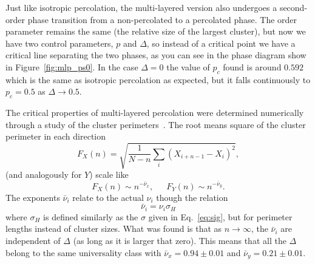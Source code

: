 Just like isotropic percolation, the multi-layered version also undergoes a
second-order phase transition from a non-percolated to a percolated phase. The
order parameter  remains the same (the relative size of the largest cluster),
but now we have two control parameters, $p$ and $\Delta$, so instead of a
critical point we have a critical line separating the two phases, as you can
see in the phase diagram show in Figure~\ref{fig:mlp_ps0}. In the case
$\Delta=0$ the value of $p_c$ found is around $0.592$ which is the same as
isotropic percolation as expected, but it falls continuously to $p_c=0.5$ as
$\Delta\rightarrow 0.5$.

The critical properties of multi-layered percolation were determined
numerically through a study of the cluster perimeters~\cite{Dayan1991,
Samyr2009}. The root means square of the cluster perimeter in each direction
\begin{equation}
    F_{X}\left(n\right)=
    \sqrt{\frac{1}{N-n}\sum_{i}{\left(X_{i+n-1}-X_{i}\right)}^{2}},
\end{equation}
(and analogously for $Y$) scale like
\begin{equation}
    F_{X}\left(n\right)\sim n^{-\bar{\nu}_{x}},
    \,\,\,\,\,\,\,\,\,
    F_{Y}\left(n\right)\sim n^{-\bar{\nu}_{y}}.
\end{equation}
The exponents $\bar{\nu}_i$ relate to the actual $\nu_i$ though the relation
\begin{equation}
    \bar{\nu}_i = \nu_i \sigma_H
\end{equation}
where $\sigma_H$ is defined similarly as the $\sigma$ given in
Eq.~\ref{eq:sig}, but for perimeter lengths instead of cluster sizes.
What was found is that as $n\rightarrow\infty$, the $\bar{\nu}_i$ are
independent of $\Delta$ (as long as it is larger that zero).
This means that all the $\Delta$ belong to the same universality class
with $\bar{\nu}_x=0.94\pm0.01$ and $\bar{\nu}_y=0.21\pm0.01$.



